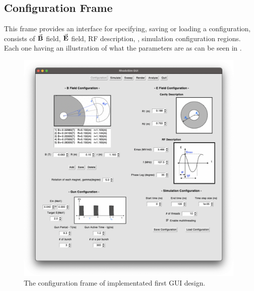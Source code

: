 \documentclass[a4paper,oneside,12pt]{report}
\numberwithin{equation}{chapter}
\begin{document}
{\subsection{Configuration Frame}
This frame provides an interface for specifying, saving or loading a configuration, consists of $\vec{\textbf{B}}$ field, $\vec{\textbf{E}}$ field, RF description, \egun, simulation configuration regions.
Each one having an illustration of what the parameters are as can be seen in .
\vspace{10pt}
\begin{figure}[h]
    \centering
    \includegraphics[width=\linewidth]{./figures/rhodoSim/GUI_config_frame.png}
    \vspace{-30pt}
    \caption{The configuration frame of implementated first GUI design.}
    \label{fig:gui_config}
\end{figure}

\clearpage
}
\end{document}
